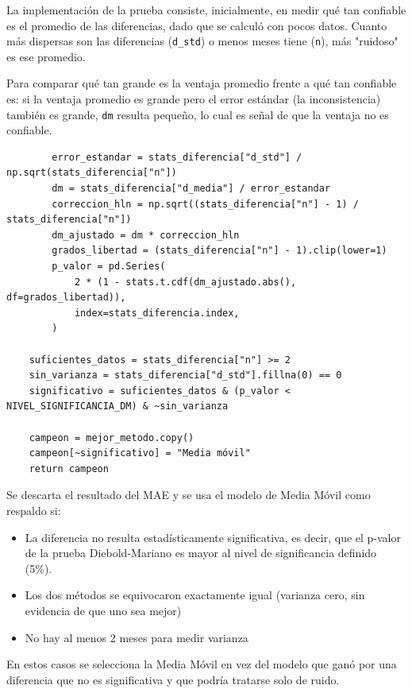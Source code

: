 La implementación de la prueba consiste, inicialmente, en medir qué tan confiable es el promedio de las diferencias, dado que se calculó con pocos datos. Cuanto más dispersas son las diferencias (\texttt{d\_std}) o menos meses tiene (\texttt{n}), más "ruidoso" es ese promedio.

Para comparar qué tan grande es la ventaja promedio frente a qué tan confiable es: si la ventaja promedio es grande pero el error estándar (la inconsistencia) también es grande, \texttt{dm} resulta pequeño, lo cual es señal de que la ventaja no es confiable.

\label{lst:campeon_diebold_mariano}
\begin{verbatim}
        error_estandar = stats_diferencia["d_std"] / np.sqrt(stats_diferencia["n"])
        dm = stats_diferencia["d_media"] / error_estandar
        correccion_hln = np.sqrt((stats_diferencia["n"] - 1) / stats_diferencia["n"])
        dm_ajustado = dm * correccion_hln
        grados_libertad = (stats_diferencia["n"] - 1).clip(lower=1)
        p_valor = pd.Series(
            2 * (1 - stats.t.cdf(dm_ajustado.abs(), df=grados_libertad)),
            index=stats_diferencia.index,
        )

    suficientes_datos = stats_diferencia["n"] >= 2
    sin_varianza = stats_diferencia["d_std"].fillna(0) == 0
    significativo = suficientes_datos & (p_valor < NIVEL_SIGNIFICANCIA_DM) & ~sin_varianza

    campeon = mejor_metodo.copy()
    campeon[~significativo] = "Media móvil"
    return campeon
\end{verbatim}

Se descarta el resultado del MAE y se usa el modelo de Media Móvil como respaldo si:

\begin{itemize}
    \item La diferencia no resulta estadísticamente significativa, es decir, que el p-valor de la prueba Diebold-Mariano es mayor al nivel de significancia definido (5\%).
    \item Los dos métodos se equivocaron exactamente igual (varianza cero, sin evidencia de que uno sea mejor)
    \item No hay al menos 2 meses para medir varianza
\end{itemize}

En estos casos se selecciona la Media Móvil en vez del modelo que ganó por una diferencia que no es significativa y que podría tratarse solo de ruido.

